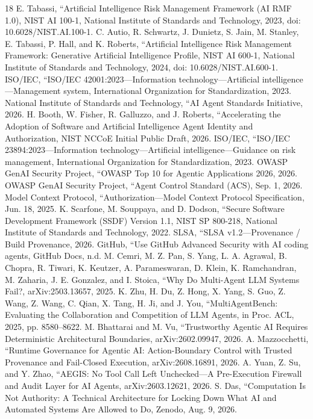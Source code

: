 \documentclass[conference]{IEEEtran}
\begin{document}
\begin{thebibliography}{18}
 E. Tabassi, ``Artificial Intelligence Risk Management Framework (AI RMF 1.0), NIST AI 100-1, National Institute of Standards and Technology, 2023, doi: 10.6028/NIST.AI.100-1.
 C. Autio, R. Schwartz, J. Dunietz, S. Jain, M. Stanley, E. Tabassi, P. Hall, and K. Roberts, ``Artificial Intelligence Risk Management Framework: Generative Artificial Intelligence Profile, NIST AI 600-1, National Institute of Standards and Technology, 2024, doi: 10.6028/NIST.AI.600-1.
 ISO/IEC, ``ISO/IEC 42001:2023---Information technology---Artificial intelligence---Management system, International Organization for Standardization, 2023.
 National Institute of Standards and Technology, ``AI Agent Standards Initiative, 2026.
 H. Booth, W. Fisher, R. Galluzzo, and J. Roberts, ``Accelerating the Adoption of Software and Artificial Intelligence Agent Identity and Authorization, NIST NCCoE Initial Public Draft, 2026.
 ISO/IEC, ``ISO/IEC 23894:2023---Information technology---Artificial intelligence---Guidance on risk management, International Organization for Standardization, 2023.
 OWASP GenAI Security Project, ``OWASP Top 10 for Agentic Applications 2026, 2026.
 OWASP GenAI Security Project, ``Agent Control Standard (ACS), Sep. 1, 2026.
 Model Context Protocol, ``Authorization---Model Context Protocol Specification, Jun. 18, 2025.
 K. Scarfone, M. Souppaya, and D. Dodson, ``Secure Software Development Framework (SSDF) Version 1.1, NIST SP 800-218, National Institute of Standards and Technology, 2022.
 SLSA, ``SLSA v1.2---Provenance / Build Provenance, 2026.
 GitHub, ``Use GitHub Advanced Security with AI coding agents, GitHub Docs, n.d.
 M. Cemri, M. Z. Pan, S. Yang, L. A. Agrawal, B. Chopra, R. Tiwari, K. Keutzer, A. Parameswaran, D. Klein, K. Ramchandran, M. Zaharia, J. E. Gonzalez, and I. Stoica, ``Why Do Multi-Agent LLM Systems Fail?, arXiv:2503.13657, 2025.
 K. Zhu, H. Du, Z. Hong, X. Yang, S. Guo, Z. Wang, Z. Wang, C. Qian, X. Tang, H. Ji, and J. You, ``MultiAgentBench: Evaluating the Collaboration and Competition of LLM Agents, in Proc. ACL, 2025, pp. 8580--8622.
 M. Bhattarai and M. Vu, ``Trustworthy Agentic AI Requires Deterministic Architectural Boundaries, arXiv:2602.09947, 2026.
 A. Mazzocchetti, ``Runtime Governance for Agentic AI: Action-Boundary Control with Trusted Provenance and Fail-Closed Execution, arXiv:2608.16891, 2026.
 A. Yuan, Z. Su, and Y. Zhao, ``AEGIS: No Tool Call Left Unchecked---A Pre-Execution Firewall and Audit Layer for AI Agents, arXiv:2603.12621, 2026.
 S. Das, ``Computation Is Not Authority: A Technical Architecture for Locking Down What AI and Automated Systems Are Allowed to Do, Zenodo, Aug. 9, 2026.
\end{thebibliography}
\end{document}
